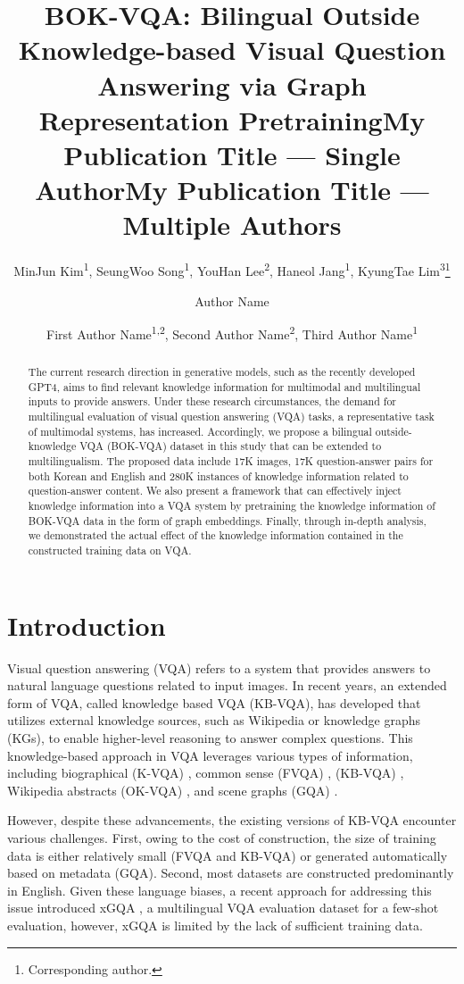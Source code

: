 \documentclass[letterpaper]{article} %
\title{BOK-VQA: Bilingual Outside Knowledge-based Visual Question Answering via Graph Representation Pretraining}
\author{
MinJun Kim\textsuperscript{\rm 1}\equalcontrib,
SeungWoo Song\textsuperscript{\rm 1}\equalcontrib,
YouHan Lee\textsuperscript{\rm 2},
Haneol Jang\textsuperscript{\rm 1},
KyungTae Lim\textsuperscript{\rm 3}\thanks{Corresponding author.}
}
\title{My Publication Title --- Single Author}
\author {
Author Name
}
\title{My Publication Title --- Multiple Authors}
\author {
First Author Name\textsuperscript{\rm 1,\rm 2},
Second Author Name\textsuperscript{\rm 2},
Third Author Name\textsuperscript{\rm 1}
}
\begin{document}
\maketitle

\begin{abstract}
The current research direction in generative models, such as the recently developed GPT4, aims to find relevant knowledge information for multimodal and multilingual inputs to provide answers. Under these research circumstances, the demand for multilingual evaluation of visual question answering (VQA) tasks, a representative task of multimodal systems, has increased.
Accordingly, we propose a bilingual outside-knowledge VQA (BOK-VQA) dataset in this study that can be extended to multilingualism. The proposed data include 17K images, 17K question-answer pairs for both Korean and English and 280K instances of knowledge information related to question-answer content. We also present a framework that can effectively inject knowledge information into a VQA system by pretraining the knowledge information of BOK-VQA data in the form of graph embeddings. Finally, through in-depth analysis, we demonstrated the actual effect of the knowledge information contained in the constructed training data on VQA.
\end{abstract}

\section{Introduction}\label{sec:introduction}
Visual question answering (VQA) \cite{antol2015vqa} refers to a system that provides answers to natural language questions related to input images. In recent years, an extended form of VQA, called knowledge based VQA (KB-VQA), has developed that utilizes external knowledge sources, such as Wikipedia or knowledge graphs (KGs), to enable higher-level reasoning to answer complex questions. This knowledge-based approach in VQA leverages various types of information, including biographical (K-VQA) \cite{K-VQA}, common sense (FVQA) \cite{wang2017fvqa}, (KB-VQA) \cite{KB-VQA}, Wikipedia abstracts (OK-VQA) \cite{schwenk2022okvqa}, and scene graphs (GQA) \cite{hudson2019gqa}.

However, despite these advancements, the existing versions of KB-VQA encounter various challenges. First, owing to the cost of construction, the size of training data is either relatively small (FVQA and KB-VQA) or generated automatically based on metadata (GQA).
Second, most datasets are constructed predominantly in English. Given these language biases, a recent approach for addressing this issue introduced xGQA \cite{pfeiffer2022xgqa}, a multilingual VQA evaluation dataset for a few-shot evaluation, however, xGQA is limited by the lack of sufficient training data.
\end{document}
